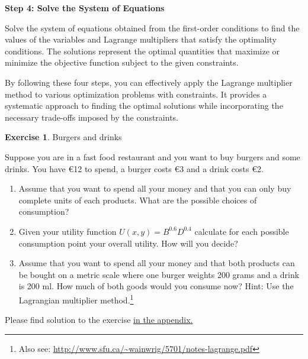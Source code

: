 \documentclass[
  12pt,
  oneside]{book}
\providecommand{\tightlist}{%
  \setlength{\itemsep}{0pt}\setlength{\parskip}{0pt}}
\theoremstyle{definition}
\theoremstyle{definition}
\theoremstyle{definition}
\newtheorem{exercise}{Exercise}[chapter]
\theoremstyle{definition}
\theoremstyle{remark}
\begin{document}
\textbf{Step 4: Solve the System of Equations}

Solve the system of equations obtained from the first-order conditions to find the values of the variables and Lagrange multipliers that satisfy the optimality conditions. The solutions represent the optimal quantities that maximize or minimize the objective function subject to the given constraints.

By following these four steps, you can effectively apply the Lagrange multiplier method to various optimization problems with constraints. It provides a systematic approach to finding the optimal solutions while incorporating the necessary trade-offs imposed by the constraints.

\begin{exercise}
\protect\hypertarget{exr:burgerutility1}{}\label{exr:burgerutility1}Burgers and drinks

Suppose you are in a fast food restaurant and you want to buy burgers and some drinks. You have €12 to spend, a burger costs €3 and a drink costs €2.

\begin{enumerate}
\def\labelenumi{\alph{enumi})}
\tightlist
\item
  Assume that you want to spend all your money and that you can only buy complete units of each products. What are the possible choices of consumption?
\item
  Given your utility function \(U(x,y)=B^{0.6}D^{0.4}\) calculate for each possible consumption point your overall utility. How will you decide?
\item
  Assume that you want to spend all your money and that both products can be bought on a metric scale where one burger weights 200 grams and a drink is 200 ml. How much of both goods would you consume now? Hint: Use the Lagrangian multiplier method.\footnote{Also see: \url{http://www.sfu.ca/~wainwrig/5701/notes-lagrange.pdf}}
\end{enumerate}

Please find solution to the exercise \protect\hyperlink{sol:burgerutility1}{in the appendix.}
\end{exercise}
\end{document}
